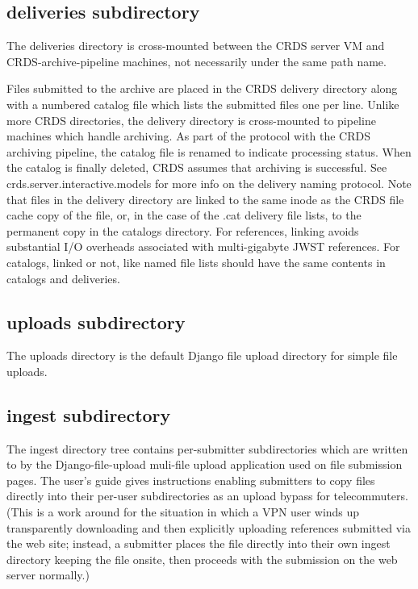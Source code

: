 \documentclass[letterpaper,10pt,english]{sphinxmanual}
\begin{document}
\subsection{deliveries subdirectory}
\label{server_guide:deliveries-subdirectory}
The deliveries directory is cross-mounted between the CRDS server VM and CRDS-archive-pipeline machines,  not
necessarily under the same path name.

Files submitted to the archive are placed in the CRDS delivery directory along with a numbered catalog file which
lists the submitted files one per line.   Unlike more CRDS directories,  the delivery directory is cross-mounted
to pipeline machines which handle archiving.  As part of the protocol with the CRDS archiving pipeline,  the catalog
file is renamed to indicate processing status.  When the catalog is finally deleted,  CRDS assumes that archiving
is successful.   See crds.server.interactive.models for more info on the delivery naming protocol.  Note that files
in the delivery directory are linked to the same inode as the CRDS file cache copy of the file,  or,  in the case
of the .cat delivery file lists, to the permanent copy in the catalogs directory.  For references,  linking avoids
substantial I/O overheads associated with multi-gigabyte JWST references.  For catalogs,  linked or not,  like named
file lists should have the same contents in catalogs and deliveries.


\subsection{uploads subdirectory}
\label{server_guide:uploads-subdirectory}
The uploads directory is the default Django file upload directory for simple file uploads.


\subsection{ingest subdirectory}
\label{server_guide:ingest-subdirectory}
The ingest directory tree contains per-submitter subdirectories which are written to by the Django-file-upload
muli-file upload application used on file submission pages.  The user's guide gives instructions enabling submitters
to copy files directly into their per-user subdirectories as an upload bypass for telecommuters.  (This is a work
around for the situation in which a VPN user winds up transparently downloading and then explicitly uploading
references submitted via the web site;  instead,  a submitter places the file directly into their own ingest
directory keeping the file onsite,  then proceeds with the submission on the web server normally.)
\end{document}
